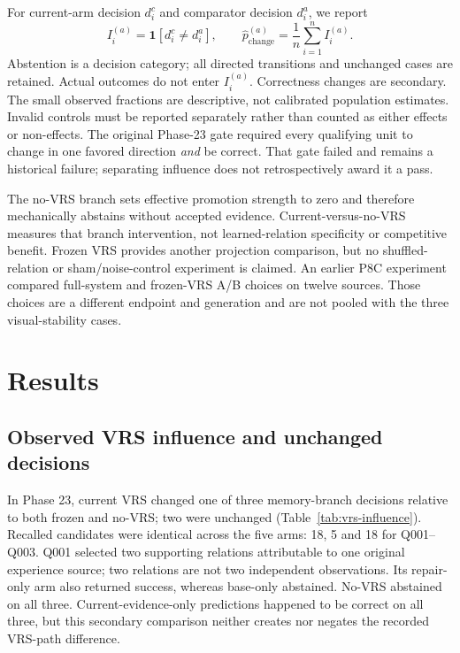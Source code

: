 \documentclass[11pt]{article}
\begin{document}
For current-arm decision $d_i^{c}$ and comparator decision $d_i^{a}$, we report
\begin{equation}
 I_i^{(a)} = \mathbf{1}[d_i^{c} \ne d_i^{a}],
 \qquad \widehat{p}_{\mathrm{change}}^{(a)} = \frac{1}{n}\sum_{i=1}^{n} I_i^{(a)}.
\end{equation}
Abstention is a decision category; all directed transitions and unchanged cases are retained. Actual outcomes do not enter $I_i^{(a)}$. Correctness changes are secondary. The small observed fractions are descriptive, not calibrated population estimates. Invalid controls must be reported separately rather than counted as either effects or non-effects. The original Phase-23 gate required every qualifying unit to change in one favored direction \emph{and} be correct. That gate failed and remains a historical failure; separating influence does not retrospectively award it a pass.

The no-VRS branch sets effective promotion strength to zero and therefore mechanically abstains without accepted evidence. Current-versus-no-VRS measures that branch intervention, not learned-relation specificity or competitive benefit. Frozen VRS provides another projection comparison, but no shuffled-relation or sham/noise-control experiment is claimed. An earlier P8C experiment compared full-system and frozen-VRS A/B choices on twelve sources. Those choices are a different endpoint and generation and are not pooled with the three visual-stability cases.

\section{Results}
\label{sec:results}

\subsection{Observed VRS influence and unchanged decisions}

In Phase 23, current VRS changed one of three memory-branch decisions relative to both frozen and no-VRS; two were unchanged (Table~\ref{tab:vrs-influence}). Recalled candidates were identical across the five arms: 18, 5 and 18 for Q001--Q003. Q001 selected two supporting relations attributable to one original experience source; two relations are not two independent observations. Its repair-only arm also returned success, whereas base-only abstained. No-VRS abstained on all three. Current-evidence-only predictions happened to be correct on all three, but this secondary comparison neither creates nor negates the recorded VRS-path difference.
\end{document}

